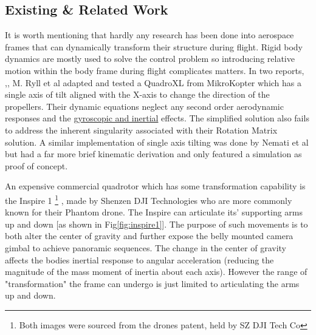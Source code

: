 \subsection{Existing \& Related Work}
\label{subsec:ch1.lit.related}
It is worth mentioning that hardly any research has been done into aerospace frames that can dynamically transform their structure during flight. Rigid body dynamics are mostly used to solve the control problem so introducing relative motion within the body frame during flight complicates matters. In two reports, \cite{tiltpropellercontrol},\cite{tiltpropellerflight}, M. Ryll et al adapted and tested a QuadroXL from MikroKopter \cite{mikrokopter} which has a single axis of tilt aligned with the X-axis to change the direction of the propellers. Their dynamic equations neglect any second order aerodynamic responses and the \underline{gyroscopic and inertial} effects. The simplified solution also fails to address the inherent singularity associated with their Rotation Matrix solution. A similar implementation of single axis tilting was done by Nemati et al \cite{singleaxistilting} but had a far more brief kinematic derivation and only featured a simulation as proof of concept.
\par
An expensive commercial quadrotor which has some transformation capability is the Inspire 1 \cite{inspire}\footnote{Both images were sourced from the drones patent, held by SZ DJI Tech Co\cite{djinspire}}
, made by Shenzen DJI Technologies who are more commonly known for their Phantom drone. The Inspire can articulate its' supporting arms up and down [as shown in Fig\ref{fig:inspire1}]. The purpose of such movements is to both alter the center of gravity and further expose the belly mounted camera gimbal to achieve panoramic sequences. The change in the center of gravity affects the bodies inertial response to angular acceleration (reducing the magnitude of the mass moment of inertia about each axis). However the range of "transformation" the frame can undergo is just limited to articulating the arms up and down.
